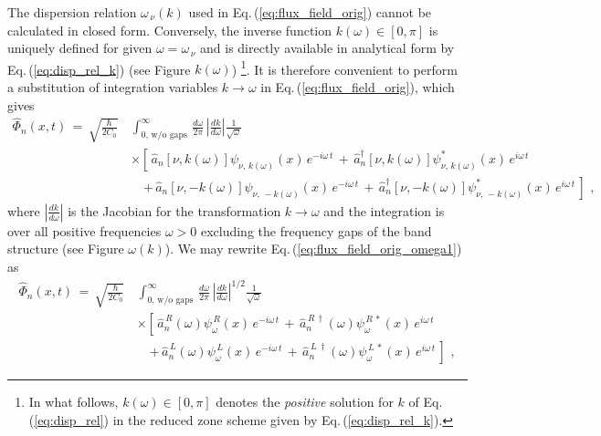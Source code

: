 \color{blue}
The dispersion relation $\omega_{\,\nu}(k)$ used in
Eq.\,(\ref{eq:flux_field_orig}) cannot be calculated in closed form. 
Conversely, the inverse function $k(\omega) \in [0,\pi]$ is uniquely defined for given 
$\omega = \omega_{\,\nu}$ and is directly available in analytical form by Eq.\,(\ref{eq:disp_rel_k})
\color{red} (see Figure $k(\omega)$) \color{black}
%
\footnote{In what follows, $k(\omega) \in [0,\pi]$ denotes the {\em positive} solution for $k$ of 
Eq.\,(\ref{eq:disp_rel}) in the reduced zone scheme given by Eq.\,(\ref{eq:disp_rel_k}).\label{foot:k}}.
%
It is therefore convenient to perform a substitution of integration variables $k \to \omega$
in Eq.\,(\ref{eq:flux_field_orig}), which gives
%
\begin{equation} \label{eq:flux_field_orig_omega1}
\begin{split}
    \hat{\Phi}_n(x,t) \, = \, \sqrt{\frac{\hbar}{2 C_0}} \, &
    \int_{0, \, \text{w/o gaps}}^{\infty} \, \frac{d\omega}{2 \pi} \, \left| \frac{d k}{d \omega} \right|
        \frac{1}{\sqrt{\omega}} \\[2mm]
    & \times \left[ \, \hat{a}_n\left[ \nu, k(\omega) \right] \psi_{\nu, \, k(\omega)}(x) \, e^{-i \omega \, t} \, + \,
    \hat{a}_n^{\dagger}\left[ \nu, k(\omega) \right] \psi_{\nu, \, k(\omega)}^*(x) \, e^{i \omega \, t} \right. \\[2mm]
    & \quad \left. + \, \hat{a}_n\left[ \nu, -k(\omega) \right] \psi_{\nu, \, -k(\omega)}(x) \, e^{-i \omega \, t} \, + \,
    \hat{a}_n^{\dagger}\left[ \nu, -k(\omega) \right] \psi_{\nu, \, -k(\omega)}^*(x) \, e^{i \omega \, t} \, \right] \, \, ,
\end{split}
\end{equation}
%
where $\displaystyle{\left| \frac{d k}{d \omega} \right|}$ is the Jacobian 
for the transformation $k \to \omega$
and the integration is over all positive frequencies $\omega > 0$ excluding the frequency gaps 
of the band structure 
\color{red} (see Figure $\omega(k)$). \color{black}
We may rewrite Eq.\,(\ref{eq:flux_field_orig_omega1}) as
%
\begin{equation} \label{eq:flux_field_orig_omega2}
\begin{split}
    \hat{\Phi}_n(x,t) \, = \, \sqrt{\frac{\hbar}{2 C_0}} \, &
    \int_{0, \, \text{w/o gaps}}^{\infty} \, \frac{d\omega}{2 \pi} \, \left| \frac{d k}{d \omega} \right|^{1/2}
        \frac{1}{\sqrt{\omega}} \\[2mm]
    & \times \left[\,\hat{a}_n^{\,R}(\omega) \psi_{\omega}^{\,R}(x) \, e^{-i \omega \, t} \, + \,
    \hat{a}_n^{\,R \, \dagger}(\omega) \psi_{\omega}^{\,R \, *}(x) \, e^{i \omega \, t} \right. \\[2mm]
    & \quad \left. + \, \hat{a}_n^{\,L}(\omega) \psi_{\omega}^{\,L}(x) \, e^{-i \omega \, t} \, + \,
    \hat{a}_n^{\,L \, \dagger}(\omega) \psi_{\omega}^{\,L \, *}(x) \, e^{i \omega \, t} \, \right] \, \, ,
\end{split}
\end{equation}
